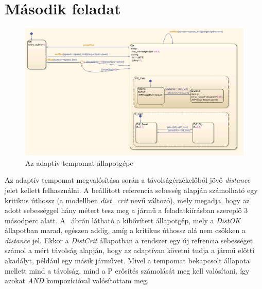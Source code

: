 \newpage
\section{Második feladat}
\begin{figure}[!ht]
	\centering
	\includegraphics[width=\textwidth,keepaspectratio]{figures/2m04/f2_chart_3.png}
	\caption{Az adaptív tempomat állapotgépe}
	\label{fig:chart2}
\end{figure}

Az adaptív tempomat megvalósítása során a távolságérzékelőből jövő \textit{distance} jelet kellett felhasználni. A beállított referencia sebesség alapján számolható egy kritikus úthossz (a modellben \textit{dist\_crit} nevű változó), mely megadja, hogy az adott sebességgel hány métert tesz meg a jármű a feladatkiírásban szereplő 3 másodperc alatt. A ~ábrán látható a kibővített állapotgép, mely a \textit{DistOK} állapotban marad, egészen addig, amíg a kritikus úthossz alá nem csökken a \textit{distance} jel. Ekkor a \textit{DistCrit} állapotban a rendszer egy új refrencia sebességet számol a mért távolság alapján, hogy az adaptívan követni tudja a jármű előtti akadályt, például egy másik járművet. Mivel a tempomat bekapcsolt állapota mellett mind a távolság, mind a P erősítés számolását meg kell valósítani, így azokat \textit{AND} kompozícióval valósítottam meg.

